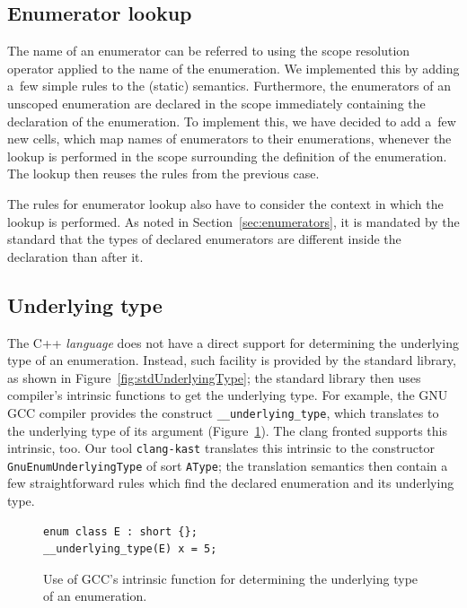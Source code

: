 \documentclass[nolot,nolof,nocover,printed]{fithesis3}
\newcommand{\clangKast}{\texttt{clang-kast}\xspace}
\begin{document}
\subsection{Enumerator lookup}

The name of an enumerator can be referred to using the scope resolution operator applied to the name of the enumeration. We implemented this by adding a~few simple rules to the (static) semantics.
Furthermore, the enumerators of an unscoped enumeration are declared in the scope immediately containing the declaration of the enumeration. To implement this, we have decided to add a~few new cells, which map names of enumerators to their enumerations, whenever the lookup is performed in the scope surrounding the definition of the enumeration. The lookup then reuses the rules from the previous case.

The rules for enumerator lookup also have to consider the context in which the lookup is performed. As noted in Section~\ref{sec:enumerators}, it is mandated by the standard that the types of declared enumerators are different inside the declaration than after it.


\subsection{Underlying type}

The C++ \textit{language} does not have a direct support for determining the underlying type of an enumeration. Instead, such facility is provided by the standard library, as shown in Figure~\ref{fig:stdUnderlyingType}; the standard library then uses compiler's intrinsic functions to get the underlying type. For example, the GNU GCC compiler provides the construct \lstinline|__underlying_type|, which translates to the underlying type of its argument (Figure~\ref{fig:gccEnumUtIntrinsic}). The clang fronted supports this intrinsic, too. Our tool \clangKast translates this intrinsic to the constructor \texttt{GnuEnumUnderlyingType} of sort \texttt{AType}; the translation semantics then contain a few straightforward rules which find the declared enumeration and its underlying type.

\begin{figure}[ht]
\begin{lstlisting}
enum class E : short {};
__underlying_type(E) x = 5;
\end{lstlisting}
\caption{Use of GCC's intrinsic function for determining the underlying type of an enumeration.}
\label{fig:gccEnumUtIntrinsic}
\end{figure}
\end{document}
